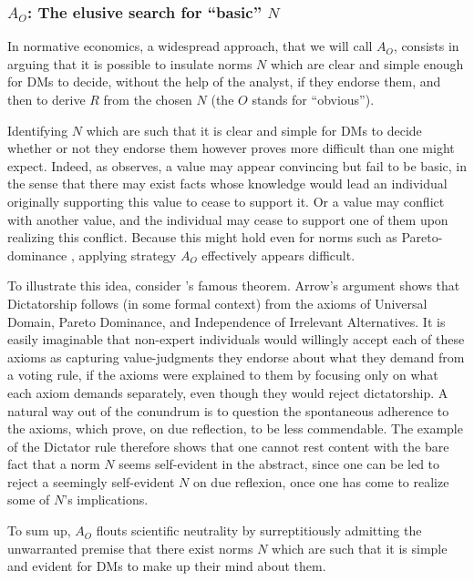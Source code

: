 \documentclass[preprint, french, english, 11pt, authoryear]{elsarticle}%
\newcommand{\protectforpdf}[1]{\texorpdfstring{\ensuremath{#1}}{#1}}
\begin{document}
\subsubsection{\texorpdfstring{$A_O$}{AO}: The elusive search for ``basic'' \protectforpdf{N}}

In normative economics, a widespread approach, that we will call $A_O$, consists in arguing that it is possible to insulate norms $N$ which are clear and simple enough for \acp{DM} to decide, without the help of the analyst, if they endorse them, and then to derive $R$ from the chosen $N$ (the $O$ stands for “obvious”).

Identifying $N$ which are such that it is clear and simple for \acp{DM} to decide whether or not they endorse them however proves more difficult than one might expect. Indeed, as \citet{sen_nature_1967} observes, a value may appear convincing but fail to be basic, in the sense that there may exist facts whose knowledge would lead an individual originally supporting this value to cease to support it. Or a value may conflict with another value, and the individual may cease to support one of them upon realizing this conflict. Because this might hold even for norms such as Pareto-dominance \citep[ch. 5 and 6]{sen_collective_1984}, applying strategy $A_O$ effectively appears difficult.

To illustrate this idea, consider \citeauthor{arrow_social_2012}’s \citeyearpar{arrow_social_2012} famous theorem. Arrow's argument shows that Dictatorship follows (in some formal context) from the axioms of Universal Domain, Pareto Dominance, and Independence of Irrelevant Alternatives. It is easily imaginable that non-expert individuals would willingly accept each of these axioms as capturing value-judgments they endorse about what they demand from a voting rule, if the axioms were explained to them by focusing only on what each axiom demands separately, even though they would reject dictatorship. A natural way out of the conundrum is to question the spontaneous adherence to the axioms, which prove, on due reflection, to be less commendable. The example of the Dictator rule therefore shows that one cannot rest content with the bare fact that a norm $N$ seems self-evident in the abstract, since one can be led to reject a seemingly self-evident $N$ on due reflexion, once one has come to realize some of $N$'s implications.

To sum up, $A_O$ flouts scientific neutrality by surreptitiously admitting the unwarranted premise that there exist norms $N$ which are such that it is simple and evident for \acp{DM} to make up their mind about them.
\end{document}
